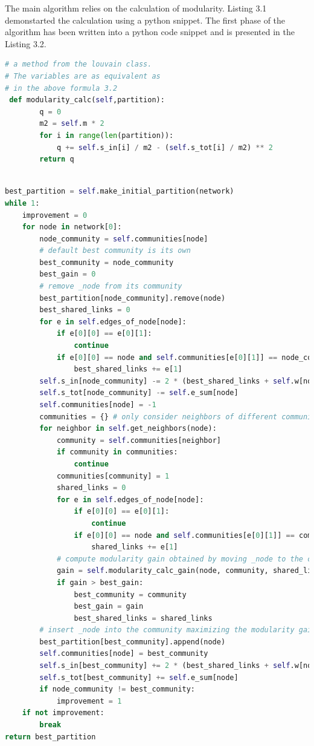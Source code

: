 \par The main algorithm relies on the calculation of modularity. Listing 3.1 demonstarted the calculation using a python snippet. The first phase of the algorithm has been written into a python code snippet and is presented in the Listing 3.2. 

\begin{lstlisting}[language=Python, caption=Modularity Calculation]
# a method from the louvain class. 
# The variables are as equivalent as 
# in the above formula 3.2
 def modularity_calc(self,partition):
        q = 0
        m2 = self.m * 2 
        for i in range(len(partition)):
            q += self.s_in[i] / m2 - (self.s_tot[i] / m2) ** 2
        return q
    
\end{lstlisting}

\begin{lstlisting}[language=Python, caption=First Phase of Louvain Algorithm]
best_partition = self.make_initial_partition(network)
while 1:
    improvement = 0
    for node in network[0]:
        node_community = self.communities[node]
        # default best community is its own
        best_community = node_community
        best_gain = 0
        # remove _node from its community
        best_partition[node_community].remove(node)
        best_shared_links = 0
        for e in self.edges_of_node[node]:
            if e[0][0] == e[0][1]:
                continue
            if e[0][0] == node and self.communities[e[0][1]] == node_community or e[0][1] == node and self.communities[e[0][0]] == node_community:
                best_shared_links += e[1]
        self.s_in[node_community] -= 2 * (best_shared_links + self.w[node])
        self.s_tot[node_community] -= self.e_sum[node]
        self.communities[node] = -1
        communities = {} # only consider neighbors of different communities
        for neighbor in self.get_neighbors(node):
            community = self.communities[neighbor]
            if community in communities:
                continue
            communities[community] = 1
            shared_links = 0
            for e in self.edges_of_node[node]:
                if e[0][0] == e[0][1]:
                    continue
                if e[0][0] == node and self.communities[e[0][1]] == community or e[0][1] == node and self.communities[e[0][0]] == community:
                    shared_links += e[1]
            # compute modularity gain obtained by moving _node to the community of _neighbor
            gain = self.modularity_calc_gain(node, community, shared_links)
            if gain > best_gain:
                best_community = community
                best_gain = gain
                best_shared_links = shared_links
        # insert _node into the community maximizing the modularity gain
        best_partition[best_community].append(node)
        self.communities[node] = best_community
        self.s_in[best_community] += 2 * (best_shared_links + self.w[node])
        self.s_tot[best_community] += self.e_sum[node]
        if node_community != best_community:
            improvement = 1
    if not improvement:
        break
return best_partition

\end{lstlisting}

